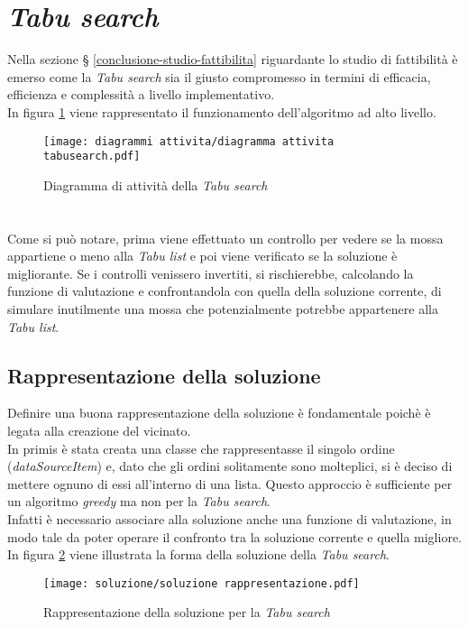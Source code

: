 \section{\textit{Tabu search}}
\label{sec:tabu-search}
\noindent Nella sezione § \ref{conclusione-studio-fattibilita}
riguardante lo studio di fattibilità è emerso come la \textit{Tabu search}
sia il giusto compromesso in termini di efficacia, efficienza
e complessità a livello implementativo.\\
In figura \ref{diagramma-attivita-tabu-search}
viene rappresentato il funzionamento dell'algoritmo ad alto livello.
\vspace*{\fill}
\begin{figure}[!h] 
    \centering 
    \texttt{[image: diagrammi attivita/diagramma attivita tabusearch.pdf]} 
    \caption{Diagramma di attività della \textit{Tabu search}}
    \label{diagramma-attivita-tabu-search}
\end{figure}
\noindent \paragraph{}\hfill\\
Come si può notare, prima viene effettuato un controllo per vedere se la mossa
appartiene o meno alla \textit{Tabu list} e poi viene verificato se la soluzione è migliorante.
Se i controlli venissero invertiti, si rischierebbe, calcolando
la funzione di valutazione e confrontandola con quella della soluzione corrente,
di simulare inutilmente una mossa che potenzialmente potrebbe appartenere alla \textit{Tabu list}.
\vspace*{\fill}

\newpage

\subsection{Rappresentazione della soluzione}
\label{sec:rappresentazione-della-soluzione}
\noindent Definire una buona rappresentazione della soluzione è fondamentale
poichè è legata alla creazione del vicinato.\\
In primis è stata creata una classe che rappresentasse
il singolo ordine (\textit{dataSourceItem}) e, dato che gli ordini solitamente sono molteplici,
si è deciso di mettere ognuno di essi all'interno di una lista.
Questo approccio è sufficiente per un algoritmo \textit{greedy} ma non per la \textit{Tabu search}.\\
Infatti è necessario associare alla soluzione anche una funzione di valutazione, in modo tale
da poter operare il confronto tra la soluzione corrente e quella migliore.\\
In figura \ref{rappresentazione-soluzione} viene illustrata la forma della soluzione della \textit{Tabu search}.
\begin{figure}[!h] 
    \centering 
    \texttt{[image: soluzione/soluzione rappresentazione.pdf]} 
    \caption{Rappresentazione della soluzione per la \textit{Tabu search}}
    \label{rappresentazione-soluzione}
\end{figure}

